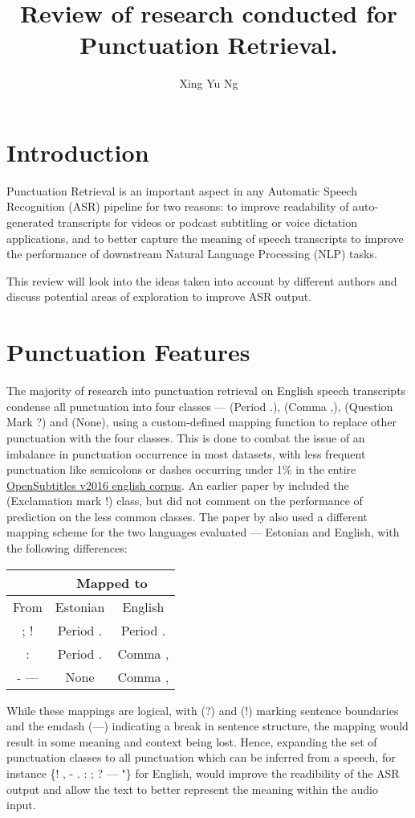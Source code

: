 \documentclass[a4paper]{article}
\title{Review of research conducted for Punctuation Retrieval.}
\author{Xing Yu Ng}
\date{}
\begin{document}
\maketitle


\begin{multicols}{2}
\section{Introduction}
\label{introduction}
Punctuation Retrieval is an important aspect in any Automatic Speech Recognition (ASR) pipeline for two reasons: to improve readability of auto-generated transcripts for videos or podcast subtitling or voice dictation applications, and to better capture the meaning of speech transcripts to improve the performance of downstream Natural Language Processing (NLP) tasks.

This review will look into the ideas taken into account by different authors and discuss potential areas of exploration to improve ASR output.

\section{Punctuation Features}
The majority of research into punctuation retrieval on English speech transcripts condense all punctuation into four classes --- (Period .), (Comma ,), (Question Mark ?) and (None), using a custom-defined mapping function to replace other punctuation with the four classes. This is done to combat the issue of an imbalance in punctuation occurrence in most datasets, with less frequent punctuation like semicolons or dashes occurring under 1\% in the entire \href{http://opus.nlpl.eu/OpenSubtitles-v2016.php}{OpenSubtitles v2016 english corpus}. An earlier paper by \cite{dynamiccrf} included the (Exclamation mark !) class, but did not comment on the performance of prediction on the less common classes. 
The paper by \cite{birnnattention} also used a different mapping scheme for the two languages evaluated --- Estonian and English, with the following differences:
\begin{center}
\begin{tabular}{|c|c|c|}
\hline
 &\multicolumn{2}{|c|}{Mapped to} \\
 \hline
From & Estonian & English \\
\hline
; ! & Period . & Period . \\
: & Period . & Comma , \\
- --- & None & Comma ,\\
\hline
\end{tabular}
\end{center}
While these mappings are logical, with (?) and (!) marking sentence boundaries and the emdash (---) indicating a break in sentence structure, the mapping would result in some meaning and context being lost. Hence, expanding the set of punctuation classes to all punctuation which can be inferred from a speech, for instance \{! , - . : ; ? --- \textellipsis "\} for English, would improve the readibility of the ASR output and allow the text to better represent the meaning within the audio input.

\end{multicols}
\end{document}
